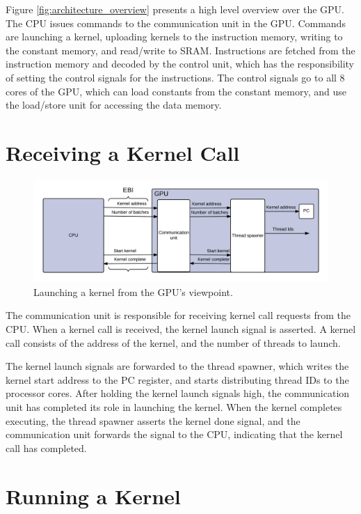\documentclass[../main/report.tex]{subfiles}
\begin{document}
Figure \ref{fig:architecture_overview} presents a high level overview over the GPU.
The CPU issues commands to the communication unit in the GPU. Commands are launching a kernel, uploading kernels to the instruction memory, writing to the constant memory, and read/write to SRAM.
Instructions are fetched from the instruction memory and decoded by the control unit, which has the responsibility of setting the control signals for the instructions.
The control signals go to all 8 cores of the GPU, which can load constants from the constant memory, and use the load/store unit for accessing the data memory.


\section{Receiving a Kernel Call}
\begin{figure}[H]
\centering
\includegraphics[width=\textwidth]{../gpu/diagrams/receiving_a_kernel_call.png}
\caption{Launching a kernel from the GPU's viewpoint.}
\label{fig:kernel_call}
\end{figure}

The communication unit is responsible for receiving kernel call requests from the CPU.
When a kernel call is received, the kernel launch signal is asserted.
A kernel call consists of the address of the kernel, and the number of threads to launch.

The kernel launch signals are forwarded to the thread spawner, which writes the kernel start address to the PC register, and starts distributing thread IDs to the processor cores. 
After holding the kernel launch signals high, the communication unit has completed its role in launching the kernel.
When the kernel completes executing, the thread spawner asserts the kernel done signal, and the communication unit forwards the signal to the CPU, indicating that the kernel call has completed.

\section{Running a Kernel}
\end{document}
